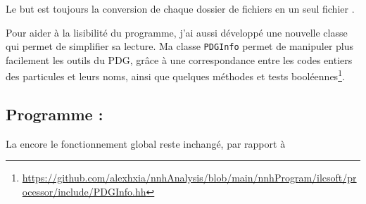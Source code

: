 Le but est toujours la conversion de chaque dossier de fichiers \SLCIO en un seul fichier \ROOT.

Pour aider à la lisibilité du programme, j'ai aussi développé une nouvelle classe qui permet de simplifier sa lecture.
Ma classe \texttt{PDGInfo} permet de manipuler plus facilement les outils du PDG, grâce à une correspondance entre les codes entiers des particules et leurs noms, ainsi que quelques méthodes et tests booléennes\footnote{\url{https://github.com/alexhxia/nnhAnalysis/blob/main/nnhProgram/ilcsoft/processor/include/PDGInfo.hh}}.

\subsection{Programme : \analysis}

La encore le fonctionnement global reste inchangé, par rapport à \original
